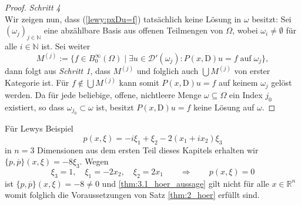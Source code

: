 \begin{proof}
\textit{Schritt 4}\\
Wir zeigen nun, dass (\ref{lewy:pxDu=f}) tatsächlich keine Lösung in $\omega$ besitzt: Sei $(\omega_j)_{j\in\mathbb{N}}$ eine abzählbare Basis aus offenen Teilmengen von $\Omega$, wobei $\omega_i\neq\emptyset$ für alle $i\in\mathbb{N}$ ist. Sei weiter
\begin{equation}
M^{(j)}:=\{f\in B_0^\infty(\Omega)\mid \exists u\in\mathscr{D}'(\omega_j): P(x,\mathrm{D})u=f\;\mathrm{auf\;}\omega_j\},
\end{equation}
dann folgt aus \textit{Schritt 1}, dass $M^{(j)}$ und folglich auch $\bigcup M^{(j)}$ von erster Kategorie ist. Für $f\notin \bigcup M^{(j)}$ kann somit $P(x,\mathrm{D})u=f$ auf keinem $\omega_j$ gelöst werden. Da für jede beliebige, offene, nichtleere Menge $\omega\subseteq\Omega$ ein Index $j_0$ existiert, so dass $\omega_{j_0}\subset\omega$ ist, besitzt $P(x,\mathrm{D})u=f$ keine Lösung auf $\omega$.
\end{proof}

Für Lewys Beispiel 
\begin{equation}
p(x,\xi)=-i\xi_1+\xi_2-2(x_1+ix_2)\xi_3
\end{equation}
in $n=3$ Dimensionen aus dem ersten Teil dieses Kapitels erhalten wir $\{p,\overline{p}\}(x,\xi)=-8\xi_3$. Wegen
\begin{equation}
\xi_3 =1,\quad \xi_1=-2x_2,\quad \xi_2=2x_1\qquad\Rightarrow\qquad p(x,\xi)=0
\end{equation}
ist $\{p,\overline{p}\}(x,\xi)=-8\neq 0$ und \ref{thm:3.1_hoer_aussage} gilt nicht für alle $x\in\mathbb{R}^n$ womit folglich die Voraussetzungen von Satz \ref{thm:2_hoer} erfüllt sind.